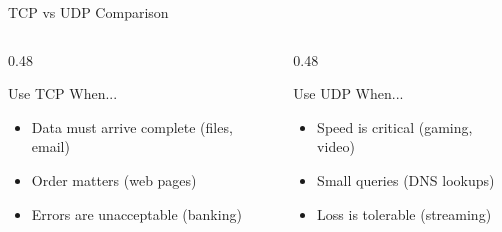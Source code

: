 \documentclass[aspectratio=169, 11pt]{beamer}
\begin{document}
\begin{frame}{TCP vs UDP Comparison}
    \vspace{0.3em}
    \begin{columns}[T]
        \begin{column}{0.48\textwidth}
            \begin{block}{Use TCP When...}
                \small
                \begin{itemize}\setlength{\itemsep}{1pt}
                    \item Data must arrive complete (files, email)
                    \item Order matters (web pages)
                    \item Errors are unacceptable (banking)
                \end{itemize}
            \end{block}
        \end{column}
        \begin{column}{0.48\textwidth}
            \begin{block}{Use UDP When...}
                \small
                \begin{itemize}\setlength{\itemsep}{1pt}
                    \item Speed is critical (gaming, video)
                    \item Small queries (DNS lookups)
                    \item Loss is tolerable (streaming)
                \end{itemize}
            \end{block}
        \end{column}
    \end{columns}
\end{frame}
\end{document}
